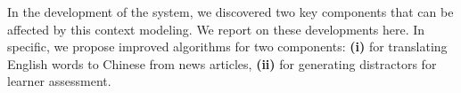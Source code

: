 In the development of the system, we discovered two key components
that can be affected by this context modeling.  We report on these
developments here. In specific, we propose improved algorithms for
two components: \textbf{(i)} for translating English words to Chinese
from news articles, \textbf{(ii)} for generating distractors 
for learner assessment.


